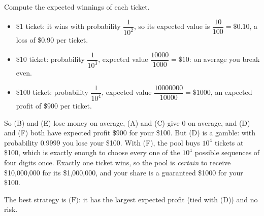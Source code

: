 Compute the expected winnings of each ticket.
\begin{itemize}
\item \$1 ticket: it wins with probability $\dfrac{1}{10^2}$, so its expected value is $\dfrac{10}{100}=\$0.10$, a loss of \$0.90 per ticket.
\item \$10 ticket: probability $\dfrac{1}{10^3}$, expected value $\dfrac{10000}{1000}=\$10$: on average you break even.
\item \$100 ticket: probability $\dfrac{1}{10^4}$, expected value $\dfrac{10000000}{10000}=\$1000$, an expected profit of \$900 per ticket.
\end{itemize}
So (B) and (E) lose money on average, (A) and (C) give $0$ on average, and (D) and (F) both have expected profit \$900 for your \$100. But (D) is a gamble: with probability $0.9999$ you lose your \$100. With (F), the pool buys $10^4$ tickets at \$100, which is exactly enough to choose every one of the $10^4$ possible sequences of four digits once. Exactly one ticket wins, so the pool is \emph{certain} to receive \$10{,}000{,}000 for its \$1{,}000{,}000, and your share is a guaranteed \$1000 for your \$100.

The best strategy is $\boxed{\text{(F)}}$: it has the largest expected profit (tied with (D)) and no risk.
